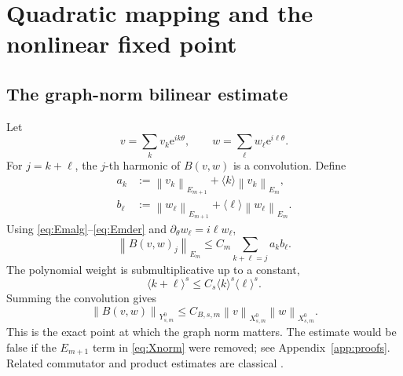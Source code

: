 \documentclass[11pt]{article}
\numberwithin{equation}{section}
\newcommand{\norm}[1]{\left\lVert #1\right\rVert}
\newcommand{\e}{\mathrm e}
\begin{document}
\section{Quadratic mapping and the nonlinear fixed point}\label{sec:nonlinear}

\subsection{The graph-norm bilinear estimate}
Let
\[
v=\sum_kv_k\e^{ik\theta},
\qquad
w=\sum_\ell w_\ell\e^{i\ell\theta}.
\]
For \(j=k+\ell\), the \(j\)-th harmonic of \(B(v,w)\) is a convolution.  Define
\begin{align}
a_k&:=\norm{v_k}_{E_{m+1}}+\langle k\rangle\norm{v_k}_{E_m},\label{eq:ak}\\
b_\ell&:=\norm{w_\ell}_{E_{m+1}}+\langle \ell\rangle\norm{w_\ell}_{E_m}.\label{eq:bl}
\end{align}
Using \eqref{eq:Emalg}--\eqref{eq:Emder} and \(\partial_\theta w_\ell=i\ell w_\ell\),
\begin{equation}
\norm{B(v,w)_j}_{E_m}
\le C_m\sum_{k+\ell=j}a_kb_\ell.
\label{eq:modeproduct}
\end{equation}
The polynomial weight is submultiplicative up to a constant,
\begin{equation}
\langle k+\ell\rangle^s
\le C_s\langle k\rangle^s\langle\ell\rangle^s.
\label{eq:weightconv}
\end{equation}
Summing the convolution gives
\begin{equation}
\boxed{
\norm{B(v,w)}_{Y^0_{s,m}}
\le C_{B,s,m}\norm v_{X^0_{s,m}}\norm w_{X^0_{s,m}}.}
\label{eq:bilbound}
\end{equation}
This is the exact point at which the graph norm matters.  The estimate would be false if the \(E_{m+1}\) term in \eqref{eq:Xnorm} were removed; see Appendix~\ref{app:proofs}.  Related commutator and product estimates are classical \cite{KatoPonce1988}.
\end{document}

